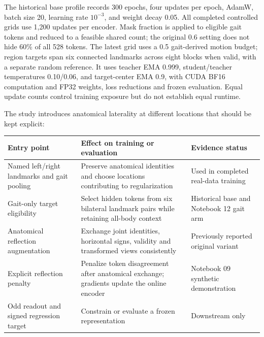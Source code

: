 \documentclass{article}
\begin{document}
The historical base profile records 300 epochs, four updates per epoch, AdamW, batch size 20, learning rate \(10^{-3}\), and weight decay 0.05. All completed controlled grids use 1,200 updates per encoder. Mask fraction is applied to eligible gait tokens and reduced to a feasible shared count; the original 0.6 setting does not hide 60\% of all 528 tokens. The latest grid uses a 0.5 gait-derived motion budget; region targets span six connected landmarks across eight blocks when valid, with a separate random reference. It uses teacher EMA 0.999, student/teacher temperatures 0.10/0.06, and target-center EMA 0.9, with CUDA BF16 computation and FP32 weights, loss reductions and frozen evaluation. Equal update counts control training exposure but do not establish equal runtime.

The study introduces anatomical laterality at different locations that should be kept explicit:

\begin{table}[htbp]
\centering
\small
\begin{tabular}{@{}
  >{\raggedright\arraybackslash}p{}
  >{\raggedright\arraybackslash}p{}
  >{\raggedright\arraybackslash}p{}@{}}
\toprule\noalign{}
\begin{minipage}[b]{\linewidth}\raggedright
Entry point
\end{minipage} & \begin{minipage}[b]{\linewidth}\raggedright
Effect on training or evaluation
\end{minipage} & \begin{minipage}[b]{\linewidth}\raggedright
Evidence status
\end{minipage} \\
\midrule\noalign{}

Named left/right landmarks and gait pooling & Preserve anatomical identities and choose locations contributing to regularization & Used in completed real-data training \\
Gait-only target eligibility & Select hidden tokens from six bilateral landmark pairs while retaining all-body context & Historical base and Notebook 12 gait arm \\
Anatomical reflection augmentation & Exchange joint identities, horizontal signs, validity and transformed views consistently & Previously reported original variant \\
Explicit reflection penalty & Penalize token disagreement after anatomical exchange; gradients update the online encoder & Notebook 09 synthetic demonstration \\
Odd readout and signed regression target & Constrain or evaluate a frozen representation & Downstream only \\
\bottomrule
\end{tabular}
\end{table}
\end{document}
